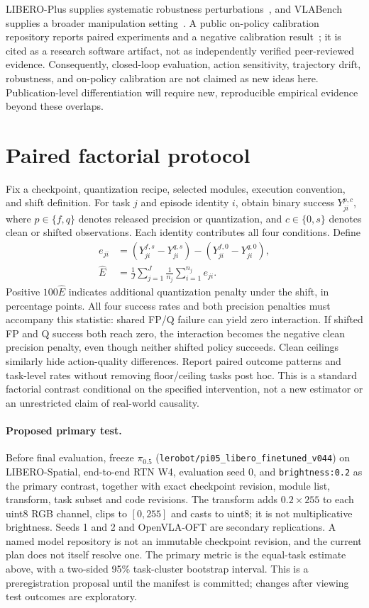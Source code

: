 \documentclass[11pt]{article}
\begin{document}
LIBERO-Plus supplies systematic robustness perturbations~\cite{fei2025liberoplus},
and VLABench supplies a broader manipulation setting~\cite{zhang2024vlabench}.
A public on-policy calibration repository reports paired experiments and a
negative calibration result~\cite{parastoopil2026calibrate}; it is cited as a
research software artifact, not as independently verified peer-reviewed evidence.
Consequently, closed-loop evaluation, action sensitivity, trajectory drift,
robustness, and on-policy calibration are not claimed as new ideas here.
Publication-level differentiation will require new, reproducible empirical
evidence beyond these overlaps.

\section{Paired factorial protocol}
Fix a checkpoint, quantization recipe, selected modules, execution convention,
and shift definition. For task $j$ and episode identity $i$, obtain binary
success $Y^{p,c}_{ji}$, where $p\in\{f,q\}$ denotes released precision or
quantization, and $c\in\{0,s\}$ denotes clean or shifted observations.
Each identity contributes all four conditions. Define
\begin{align}
e_{ji} &= (Y^{f,s}_{ji}-Y^{q,s}_{ji})
          -(Y^{f,0}_{ji}-Y^{q,0}_{ji}),\\
\widehat E &= \frac{1}{J}\sum_{j=1}^{J}
                 \frac{1}{n_j}\sum_{i=1}^{n_j}e_{ji}.
\end{align}
Positive $100\widehat E$ indicates additional quantization penalty under the
shift, in percentage points. All four success rates and both precision penalties
must accompany this statistic: shared FP/Q failure can yield zero interaction.
If shifted FP and Q success both reach zero, the interaction becomes the negative
clean precision penalty, even though neither shifted policy succeeds. Clean
ceilings similarly hide action-quality differences. Report paired outcome
patterns and task-level rates without removing floor/ceiling tasks post hoc.
This is a standard factorial contrast conditional on the specified intervention,
not a new estimator or an unrestricted claim of real-world causality.

\paragraph{Proposed primary test.}
Before final evaluation, freeze $\pi_{0.5}$ (\texttt{lerobot/pi05\_libero\_finetuned\_v044}) on
LIBERO-Spatial, end-to-end RTN W4, evaluation seed 0, and
\texttt{brightness:0.2} as the primary contrast, together with exact checkpoint
revision, module list, transform, task subset and code revisions. The transform
adds $0.2\times255$ to each uint8 RGB channel, clips to $[0,255]$ and casts to
uint8; it is not multiplicative brightness. Seeds 1 and 2 and OpenVLA-OFT are
secondary replications. A named model repository is not an immutable checkpoint
revision, and the current plan does not itself resolve one.
The primary metric is the equal-task estimate above, with a two-sided 95\%
task-cluster bootstrap interval. This is a preregistration proposal until the
manifest is committed; changes after viewing test outcomes are exploratory.
\end{document}
